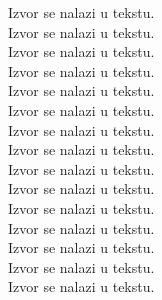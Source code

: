 \documentclass[a4paper]{article}
\begin{document}
Izvor \cite{misc:1} se nalazi u tekstu. \\ 
Izvor \cite{misc:2} se nalazi u tekstu. \\
Izvor \cite{misc:3} se nalazi u tekstu.\\
Izvor \cite{misc:4} se nalazi u tekstu.\\
Izvor \cite{misc:5} se nalazi u tekstu.\\
Izvor \cite{misc:6} se nalazi u tekstu.\\
Izvor \cite{misc:7} se nalazi u tekstu.\\
Izvor \cite{misc:8} se nalazi u tekstu.\\
Izvor \cite{misc:9} se nalazi u tekstu.\\
Izvor \cite{book:1} se nalazi u tekstu.\\
Izvor \cite{book:2} se nalazi u tekstu.\\
Izvor \cite{aritcle:1} se nalazi u tekstu.\\
Izvor \cite{article:2} se nalazi u tekstu.\\
Izvor \cite{article:3} se nalazi u tekstu.\\
Izvor \cite{article:4} se nalazi u tekstu.\\

 

\end{document}

